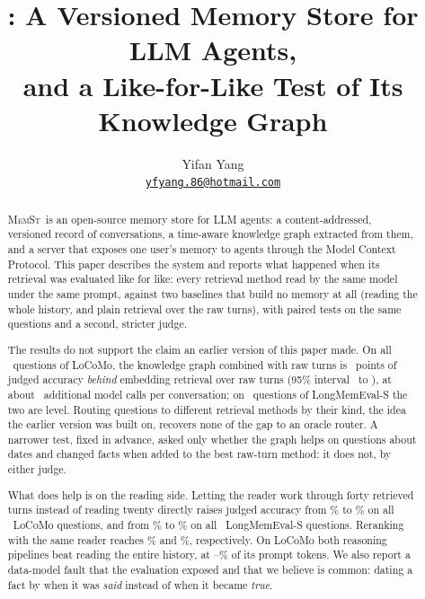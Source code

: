 \documentclass[11pt,letterpaper]{article}
\title{\textbf{\memst}: A Versioned Memory Store for LLM Agents,\\ and a Like-for-Like Test of Its Knowledge Graph}
\author{Yifan Yang\\
\vspace{0.5em}
\hspace{0.6cm} \href{mailto:yfyang.86@hotmail.com}{\texttt{yfyang.86@hotmail.com}}}
\newcommand{\memst}{\textsc{MemSt}}
\begin{document}
\maketitle

\begin{abstract}
\vspace{0.3cm}

\memst\ is an open-source memory store for LLM agents: a content-addressed, versioned record of conversations, a time-aware knowledge graph extracted from them, and a server that exposes one user's memory to agents through the Model Context Protocol. This paper describes the system and reports what happened when its retrieval was evaluated like for like: every retrieval method read by the same model under the same prompt, against two baselines that build no memory at all (reading the whole history, and plain retrieval over the raw turns), with paired tests on the same questions and a second, stricter judge.

The results do not support the claim an earlier version of this paper made. On all \numLocomoQuestions\ questions of LoCoMo, the knowledge graph combined with raw turns is \numLocomoDefaultVsDense\ points of judged accuracy \emph{behind} embedding retrieval over raw turns (95\% interval \numLocomoDefaultVsDenseLow\ to \numLocomoDefaultVsDenseHigh), at about \numLocomoGraphCalls\ additional model calls per conversation; on \numLmeQuestions\ questions of LongMemEval-S the two are level. Routing questions to different retrieval methods by their kind, the idea the earlier version was built on, recovers none of the gap to an oracle router. A narrower test, fixed in advance, asked only whether the graph helps on questions about dates and changed facts when added to the best raw-turn method: it does not, by either judge.

What does help is on the reading side. Letting the reader work through forty retrieved turns instead of reading twenty directly raises judged accuracy from \numFullReadRawDenseJudged\% to \numFullReadDenseWideReasonJudged\% on all \numFullReadQuestions\ LoCoMo questions, and from \numFullLmeRawDenseJudged\% to \numFullLmeDenseWideReasonJudged\% on all \numFullLmeQuestions\ LongMemEval-S questions. Reranking with the same reader reaches \numFullReadRerankReasonJudged\% and \numFullLmeRerankReasonJudged\%, respectively. On LoCoMo both reasoning pipelines beat reading the entire history, at \numFullReadWideReasonTokenShare--\numFullReadRerankReasonTokenShare\% of its prompt tokens. We also report a data-model fault that the evaluation exposed and that we believe is common: dating a fact by when it was \emph{said} instead of when it became \emph{true}.


\end{abstract}
\end{document}
